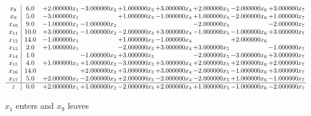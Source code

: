 \documentclass[10pt]{article}
\begin{document}
\[\begin{array}{c| c c@{\hskip 2pt} c@{\hskip 2pt} c@{\hskip 2pt} c@{\hskip 2pt} c@{\hskip 2pt} c@{\hskip 2pt} c@{\hskip 2pt} }
 x_{8}   &  6.0 & + 2.000000 x_{1} & -3.000000 x_{2} & + 1.000000 x_{3} & + 3.000000 x_{4} & + 2.000000 x_{5} & -2.000000 x_{6} & + 3.000000 x_{7}\\
 x_{9}   &  5.0 & -3.000000 x_{1} &   & + 1.000000 x_{3} & -1.000000 x_{4} & + 1.000000 x_{5} & -2.000000 x_{6} & + 1.000000 x_{7}\\
 x_{10}   &  9.0 & -1.000000 x_{1} & -1.000000 x_{2} &    &   & -2.000000 x_{5} &   & -2.000000 x_{7}\\
 x_{11}   &  10.0 & + 3.000000 x_{1} & -1.000000 x_{2} & -2.000000 x_{3} & + 3.000000 x_{4} & -1.000000 x_{5} & -1.000000 x_{6} & + 3.000000 x_{7}\\
 x_{12}   &  14.0 & -1.000000 x_{1} &   & + 1.000000 x_{3} & -1.000000 x_{4} &   & + 2.000000 x_{6} &   \\
 x_{13}   &  2.0 & + 1.000000 x_{1} &   & -2.000000 x_{3} & + 3.000000 x_{4} & + 3.000000 x_{5} &   & -1.000000 x_{7}\\
 x_{14}   &  1.0  &   & -1.000000 x_{2} & + 3.000000 x_{3} &   & -2.000000 x_{5} & -3.000000 x_{6} & + 3.000000 x_{7}\\
 x_{15}   &  4.0 & + 1.000000 x_{1} & + 1.000000 x_{2} & -3.000000 x_{3} & + 3.000000 x_{4} & + 2.000000 x_{5} & + 2.000000 x_{6} & + 2.000000 x_{7}\\
 x_{16}   &  14.0  &   & + 2.000000 x_{2} & + 3.000000 x_{3} & + 3.000000 x_{4} & -2.000000 x_{5} & -1.000000 x_{6} & + 3.000000 x_{7}\\
 x_{17}   &  5.0 & + 2.000000 x_{1} & -2.000000 x_{2} & + 2.000000 x_{3} & -2.000000 x_{4} & -2.000000 x_{5} & + 1.000000 x_{6} & -1.000000 x_{7}\\
\hline
z    &  0.0 & + 2.000000 x_{1} & + 1.000000 x_{2} & -2.000000 x_{3} & + 2.000000 x_{4} & + 1.000000 x_{5} & -1.000000 x_{6} & -2.000000 x_{7}\\
\end{array}\]


 $ x_{1} $ enters and $ x_{9} $ leaves 
\end{document}
